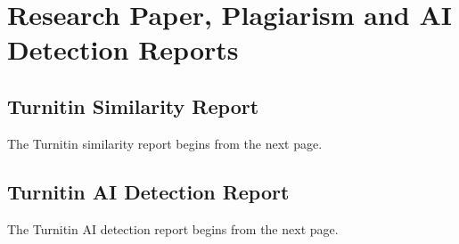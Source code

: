 \documentclass[12pt,a4paper]{report}
\begin{document}
\renewcommand{\bibname}{References and Bibliography}



\clearpage
\appendix
\pagestyle{mainstyle}

\chapter{Research Paper, Plagiarism and AI Detection Reports}


\section{Turnitin Similarity Report}

The Turnitin similarity report begins from the next page.



\section{Turnitin AI Detection Report}

The Turnitin AI detection report begins from the next page.


\end{document}
